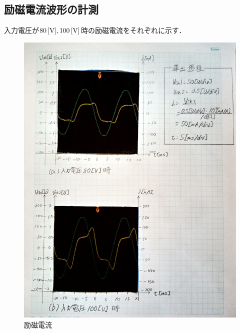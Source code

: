 \subsection{励磁電流波形の計測}
入力電圧が$80\,[\rm{V}], 100\,[\rm{V}]$時の励磁電流をそれぞれに示す．
\begin{figure}[h]
	\centering
	\includegraphics[scale=0.8]{./data/graph/1.pdf}
	\caption{励磁電流}
	\label{fig:1}
\end{figure}

